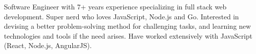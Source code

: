 

\begin{cvparagraph}

Software Engineer with 7+ years experience specializing in full stack web development. Super nerd who loves JavaScript, Node.js and Go. Interested in devising a better problem-solving method for challenging tasks, and learning new technologies and tools if the need arises. Have worked extensively with JavaScript (React, Node.js, AngularJS).
\end{cvparagraph}
